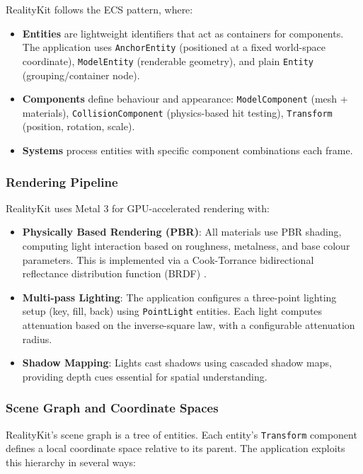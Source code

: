 RealityKit follows the ECS pattern, where:

\begin{itemize}
    \item \textbf{Entities} are lightweight identifiers that act as containers for components. The application uses \texttt{AnchorEntity} (positioned at a fixed world-space coordinate), \texttt{ModelEntity} (renderable geometry), and plain \texttt{Entity} (grouping/container node).
    \item \textbf{Components} define behaviour and appearance: \texttt{ModelComponent} (mesh + materials), \texttt{CollisionComponent} (physics-based hit testing), \texttt{Transform} (position, rotation, scale).
    \item \textbf{Systems} process entities with specific component combinations each frame.
\end{itemize}

\subsubsection{Rendering Pipeline}

RealityKit uses Metal 3 for GPU-accelerated rendering with:

\begin{itemize}
    \item \textbf{Physically Based Rendering (PBR)}: All materials use PBR shading, computing light interaction based on roughness, metalness, and base colour parameters. This is implemented via a Cook-Torrance bidirectional reflectance distribution function (BRDF) \cite{cook1982reflectance}.
    \item \textbf{Multi-pass Lighting}: The application configures a three-point lighting setup (key, fill, back) using \texttt{PointLight} entities. Each light computes attenuation based on the inverse-square law, with a configurable attenuation radius.
    \item \textbf{Shadow Mapping}: Lights cast shadows using cascaded shadow maps, providing depth cues essential for spatial understanding.
\end{itemize}

\subsubsection{Scene Graph and Coordinate Spaces}

RealityKit's scene graph is a tree of entities. Each entity's \texttt{Transform} component defines a local coordinate space relative to its parent. The application exploits this hierarchy in several ways:


